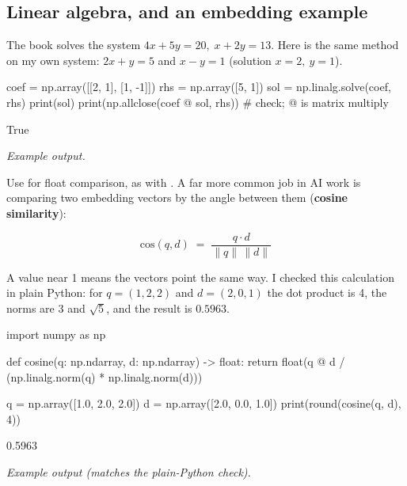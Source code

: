\subsection{Linear algebra, and an embedding example}

The book solves the system $4x+5y=20,\; x+2y=13$. Here is the same method on my own system:
$2x + y = 5$ and $x - y = 1$ (solution $x=2,\ y=1$).

\begin{pycode}
coef = np.array([[2, 1], [1, -1]])
rhs = np.array([5, 1])
sol = np.linalg.solve(coef, rhs)
print(sol)
print(np.allclose(coef @ sol, rhs))     # check; @ is matrix multiply
\end{pycode}
\begin{rawcode}
[2. 1.]
True
\end{rawcode}
\noindent\textit{Example output.}

Use  for float comparison, as with . A far more common job in
AI work is comparing two embedding vectors by the angle between them (\textbf{cosine similarity}):

\begin{center}
\end{center}

\[
\text{cos}(q,d) \;=\; \frac{q\cdot d}{\lVert q\rVert\,\lVert d\rVert}
\]

A value near 1 means the vectors point the same way. I checked this calculation in plain
Python: for $q=(1,2,2)$ and $d=(2,0,1)$ the dot product is 4, the norms are 3 and $\sqrt5$, and the
result is $0.5963$.

\begin{pycode}
import numpy as np

def cosine(q: np.ndarray, d: np.ndarray) -> float:
    return float(q @ d / (np.linalg.norm(q) * np.linalg.norm(d)))

q = np.array([1.0, 2.0, 2.0])
d = np.array([2.0, 0.0, 1.0])
print(round(cosine(q, d), 4))
\end{pycode}
\begin{rawcode}
0.5963
\end{rawcode}
\noindent\textit{Example output (matches the plain-Python check).}

